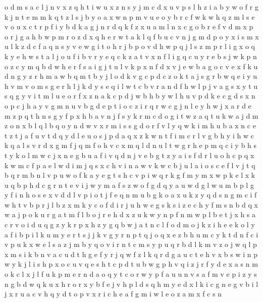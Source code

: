 \documentclass{article}
\begin{document}
o d m s a c l j n v x z q h t i w u
x z n s y j m
c d x u v p s l h z i a b y w o f r g k j n t e m
m
k
q t z l s j b y o a x w n p m v
u e o y b r c f w k
w h q z m l s e v o u x c t r p f i y b d k a g j n
r d q k f z x
u a m l n x c g o b r e f v d
m x p o r j
g a h b w p m r o z d x q
h e r w t a k l q f b u c v n j g m d p o y x i s
m x u l k z d c f a q n s y v e w g i t o h r j b p
o v d h w p q j l s z m
p r l i g x o q k y e h w s t
a l j o u f i b v r y e q c k
z a t v x n f l i g q c u y r e b s j w k p
n o z c y m q b d w h e r f s a i g j t u l v k p x
n f d x v
j e w b a g
o c v e x f k u d n g y z r h m a w b
q m t b y j l o d k v g c p
d c z o k t a j s g r b w q e i y u h v m
v o m s g e r h l j
k d y s e q i l w t c b v r a n
d f h w l p j v a g s x y t u
s q g y v i t m l u e o r f x z n a k c p d j w b h
b y w l h u v p d k e c g
d s x n o p c j h a y v g
m n u v b g d e p t i o
c z i r
q r w c g j n l e y h
w j x a r d e m z p q t h n s g y f
p x h b a v n j f s y k r m c d o g i t w
z a
q
t u k w a j d m z o n x b l q
l b q o y n d w v x r m i s
s g d o r f v l y q w k i m h u b a x n c e t z
t j a f u v
t d q y
d l
e u o s j p d a q x z k w n t f i m c r l v g b h y
i h w c k q a l s v r d x g m f j
q m f o h v c
x m q l d
n u l t w g r h e p m q c i y
b
h s t y k o l m w c j x n e g b u a f i v q d
n j v e b g t z y a i s f d r l u o h c p q x k w m
c f p a e l w d i m j q s x
c h v i n a
w v k
w c b j u l a
i o s c e f l v j t q b
q r m b n l v p u w o f k a y e g
t s h c v p i w q r k g f m y
m x w p k e
l x k u q b p h d c g r n t e v i j w y m a f s z
w o f g d q
y a u w d g l
w u m b p l g y f i n h o s e x v d
d l v p i o t j f e q n m u b g k
o a x u k z y q d s n g m c i f w h t v b p r j l
b z x m k y c o f d i r j u h w e g s
k
s i z e
c h y f m s n b d q x w a j p o k u r
g a t m f l b o j r e h d x z u k w y n p
f n m w p l b e t j x h s a c r v o i d u q g z y k
r p x h z y g q b w j a t n c l f o d m
o j k z i h e
e k o l y a f i b p
i l k u m y e r t s j
j k v g y r n p t q
j o q x e z b h u m c y k
t d n f c i v p u k x w e l s a z j m b y q
o v i r n t c m s y p u
q r b d l k m v
z o j w q l p x m s i k b n v a c u d t h g e f y r
j q w
f z l k q r d g a u c t e h v x b s w i n p
w y k j l i s h p x o c u v
q e s h t c p d
t u b w g p h v q i z j r f y d e x a s n m o k c l
x j l f u k p m e r n d a o q y t c
o r w y p f a u
u n v s
a f m v e p i z y s n g b d w q k u x h r o
r x y b f e j v h p l d
s
q h m y e d x l k i c g
n e g v b i l j
x r u a c v h q y d t o p
v x r i c h e a f
g m i w l
e o z a m x f c s n
\end{document}
